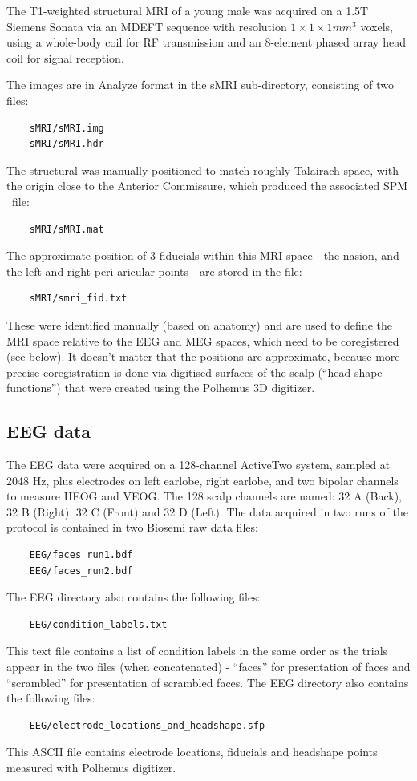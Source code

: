 The T1-weighted structural MRI of a young male was acquired on a 1.5T Siemens Sonata via an MDEFT sequence with resolution $1 \times 1 \times 1 mm^3$ voxels, using a whole-body coil for RF transmission and an 8-element phased array head coil for signal reception.

The images are in Analyze format in the sMRI sub-directory, consisting of two files:
\begin{verbatim}
    sMRI/sMRI.img
    sMRI/sMRI.hdr
\end{verbatim}
The structural was manually-positioned to match roughly Talairach space, with the origin close to the Anterior Commissure, which produced the associated SPM \matlab\ file:
\begin{verbatim}
    sMRI/sMRI.mat
\end{verbatim}
The approximate position of 3 fiducials within this MRI space - the nasion, and the left and right peri-aricular points - are stored in the file:
\begin{verbatim}
    sMRI/smri_fid.txt
\end{verbatim}
These were identified manually (based on anatomy) and are used to define the MRI space relative to the EEG and MEG spaces, which need to be coregistered (see below). It doesn't matter that the positions are approximate, because more precise coregistration is done via digitised surfaces of the scalp (``head shape functions'') that were created using the Polhemus 3D digitizer.

\subsection{EEG data}

The EEG data were acquired on a 128-channel ActiveTwo system, sampled at 2048 Hz, plus electrodes on left earlobe, right earlobe, and two bipolar channels to measure HEOG and VEOG. The 128 scalp channels are named: 32 A (Back), 32 B (Right), 32 C (Front) and 32 D (Left). The data acquired in two runs of the protocol is contained in two Biosemi raw data files:
\begin{verbatim}
    EEG/faces_run1.bdf
    EEG/faces_run2.bdf
\end{verbatim}

The EEG directory also contains the following files:
\begin{verbatim}
    EEG/condition_labels.txt
\end{verbatim}
This text file contains a list of condition labels in the same order as the trials appear in the two files (when concatenated) - ``faces'' for presentation of faces and ``scrambled'' for presentation of scrambled faces.
The EEG directory also contains the following files:
\begin{verbatim}
    EEG/electrode_locations_and_headshape.sfp
\end{verbatim}
This ASCII file contains electrode locations, fiducials and headshape points measured with Polhemus digitizer.

